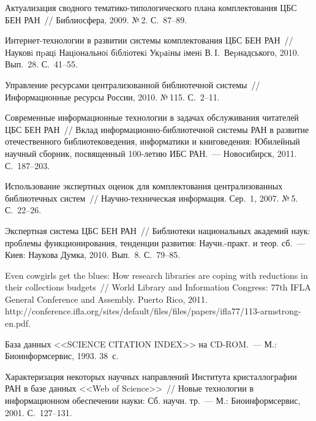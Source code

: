 \begin{multicols}{2}
{{\begin{thebibliography}{99}
Актуализация сводного тематико-типологического плана комплектования ЦБС БЕН 
РАН~// Библиосфера, 2009. №\,2. С.~87--89. 

Ин\-тер\-нет-тех\-но\-ло\-гии в развитии системы комплектования ЦБС БЕН РАН~// 
Науковi пpацi Нацiональноi бiблiотекi Укpаiны iменi В.\,I.~Веpнадського, 2010. Вып.~28. 
С.~41--55. 

Управление ресурсами централизованной библиотечной системы~// Информационные 
ресурсы России, 2010. №\,115. С.~2--11. 

Современные информационные технологии в задачах обслуживания читателей ЦБС БЕН 
РАН~// Вклад ин\-фор\-ма\-ци\-он\-но-библиотечной системы РАН в развитие отечественного 
библиотековедения, информатики и книговедения: Юбилейный научный сборник, 
посвященный 100-ле\-тию ИБС РАН.~---  Новосибирск, 2011. С.~187--203. 


Использование экспертных оценок для комплектования централизованных библиотечных 
сис\-тем~// Научно-техническая информация. Сер.~1, 2007. №\,5. С.~22--26. 

Экспертная система ЦБС БЕН РАН~// Библиотеки национальных академий наук: 
проблемы функционирования, тенденции развития: Научн.-практ. и 
теор. сб.~--- Киев: Наукова Думка, 2010. Вып.~8. С.~79--85. 

Even cowgirls get the blues: How research libraries are coping with reductions in their 
collections budgets~// World Library and Information Congress: 77th IFLA General Conference 
and Assembly. Puerto Rico, 2011.
{\sf http://\linebreak conference.ifla.org/sites/default/files/files/papers/\linebreak ifla77/113-armstrong-en.pdf}.


База данных <<SCIENCE CITATION INDEX>> на CD-ROM.~--- М.: Биоинформсервис, 
1993. 38~с. 

Характеризация некоторых научных направлений Института кристаллографии РАН в базе 
данных <<Web of Science>>~// Новые технологии в информационном обеспечении науки: 
Сб. научн. тр.~--- М.: Биоинформсервис, 2001. С.~127--131. 


\end{thebibliography}}}
\end{multicols}
